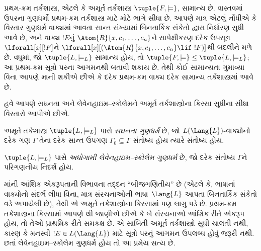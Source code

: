 \begin{rem}
  પ્રથમ-ક્રમ તર્કશાસ્ત્ર, એટલે કે અમૂર્ત તર્કશાસ્ત્ર
  $\tuple{F, \models}$, સામાન્ય છે. વાસ્તવમાં ઉપરના ગુણધર્મો
  પ્રથમ-ક્રમ તર્કશાસ્ત્ર માટે મોટે ભાગે સીધા છે. આપણે માત્ર એટલું
  નોંધીએ કે વિસ્તાર ગુણધર્મ વાક્યમાં આવતા સાન્ત સંખ્યામાં બિનતાર્કિક
  સંકેતો દ્વારા નિર્ધારણ સુધી આવે છે,
  અને વાક્ય $!E$નું $\Atom{R}{x, c_1, \dots, c_n}$ને
  સાપેક્ષીકરણ દરેક ઉપસૂત્ર $\lforall[x][!F]$ને
  $\lforall[x][(\Atom{R}{x, c_1, \dots, c_n} \lif \ !F)]$થી બદલીને
  મળે છે. વધુમાં, જો $\tuple{L, \models_L}$ સામાન્ય હોય, તો
  $\tuple{F, \models} \leq \tuple{L, \models_{L}}$; આ પ્રથમ-ક્રમ
  સૂત્રો પરના આગમનથી બતાવી શકાય છે. તેથી કોઈ સામાન્યતા ગુમાવ્યા
  વિના આપણે માની શકીએ છીએ કે દરેક પ્રથમ-ક્રમ વાક્ય દરેક સામાન્ય
  તર્કશાસ્ત્રમાં આવે છે.
\end{rem}
\endgroup


\begingroup
\makeatletter{}\makeatother


\label{guunit:OLP-0206}


હવે આપણે સઘનતા અને લેવેનહાઇમ--સ્કોલેમને અમૂર્ત તર્કશાસ્ત્રોના કિસ્સા
સુધીના સીધા વિસ્તારો આપીએ છીએ.

\begin{defn}
અમૂર્ત તર્કશાસ્ત્ર $\tuple{L, \models_L}$ પાસે \emph{સઘનતા
  ગુણધર્મ} છે, જો $L(\Lang{L})$-વાક્યોનો દરેક ગણ $\Gamma$ તેના
દરેક સાન્ત ઉપગણ $\Gamma_0 \subseteq \Gamma$ સંતોષ્ય હોય ત્યારે સંતોષ્ય
હોય.
\end{defn}

\begin{defn}
$\tuple{L, \models_L}$ પાસે \emph{અધોગામી લેવેનહાઇમ--સ્કોલેમ
  ગુણધર્મ} છે, જો દરેક સંતોષ્ય $\Gamma$ને પરિગણનીય નિદર્શ હોય.
\end{defn}


માંની આંશિક એકરૂપતાની વિભાવના તદ્દન
``બીજગણિતીય'' છે (એટલે કે, ભાષાનાં વાક્યોનો સંદર્ભ લીધા વિના,
માત્ર સંરચનાઓની ભાષા~$\Lang{L}$ આપતા બિનતાર્કિક સંકેતો
વડે અપાયેલી છે), તેથી એ અમૂર્ત તર્કશાસ્ત્રોના કિસ્સામાં પણ લાગુ પડે છે.
પ્રથમ-ક્રમ તર્કશાસ્ત્રના કિસ્સામાં આપણે
થી જાણીએ છીએ કે બે સંરચનાઓ આંશિક
રીતે એકરૂપ હોય, તો તેઓ પ્રાથમિક રીતે સમકક્ષ છે. એ સાબિતી અમૂર્ત
તર્કશાસ્ત્રો સુધી ચાલતી નથી, કારણ કે મનસ્વી $!E \in L(\Lang{L})$ માટે
સૂત્રો પરનું આગમન ઉપલબ્ધ હોવું જરૂરી નથી. છતાં લેવેનહાઇમ--સ્કોલેમ
ગુણધર્મ હોય તો આ પ્રમેય સત્ય છે.

